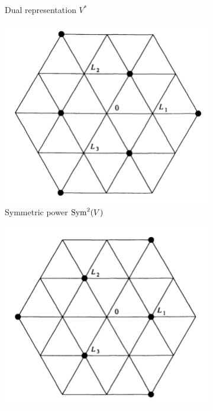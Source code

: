 \documentclass{report}
\begin{document}
\begin{figure}[h]
\begin{subfigure}[b]{0.23\textwidth}
        \caption{Dual representation $V^*$}
        \label{fig:sl_3_C_weights_dual}
    \end{subfigure}
    \hfill
    \begin{subfigure}[b]{0.23\textwidth}
        \centering
        \includegraphics[width=\textwidth]{sl_3_C_weights_symmetric.png}
        \caption{Symmetric power $\operatorname{Sym}^2(V)$}
        \label{fig:sl_3_C_weights_symmetric}
    \end{subfigure}
    \hfill
    \begin{subfigure}[b]{0.23\textwidth}
        \centering
        \includegraphics[width=\textwidth]{sl_3_C_weights_symmetric_dual.png}

\end{subfigure}
\end{figure}
\end{document}
